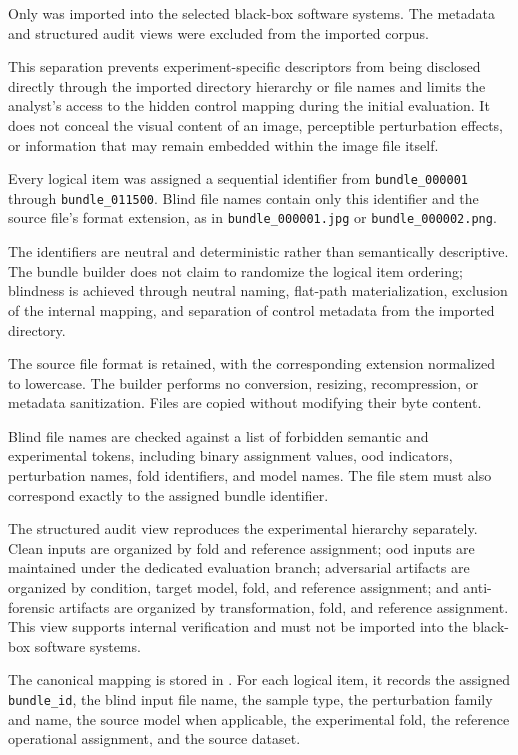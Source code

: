 Only
was imported into the selected black-box software systems. The metadata and
structured audit views were excluded from the imported corpus.

This separation prevents experiment-specific descriptors from being disclosed
directly through the imported directory hierarchy or file names and limits the
analyst's access to the hidden control mapping during the initial evaluation.
It does not conceal the visual content of an image, perceptible perturbation
effects, or information that may remain embedded within the image file itself.

Every logical item was assigned a sequential identifier from
\texttt{bundle\_000001} through \texttt{bundle\_011500}. Blind file names
contain only this identifier and the source file's format extension, as in
\texttt{bundle\_000001.jpg} or \texttt{bundle\_000002.png}.

The identifiers are neutral and deterministic rather than semantically
descriptive. The bundle builder does not claim to randomize the logical item
ordering; blindness is achieved through neutral naming, flat-path
materialization, exclusion of the internal mapping, and separation of control
metadata from the imported directory.

The source file format is retained, with the corresponding extension
normalized to lowercase. The builder performs no conversion, resizing,
recompression, or metadata sanitization. Files are copied without modifying
their byte content.

Blind file names are checked against a list of forbidden semantic and
experimental tokens, including binary assignment values, \gls{ood}
indicators, perturbation names, fold identifiers, and model names. The
file stem must also correspond exactly to the assigned bundle identifier.

The structured audit view reproduces the experimental hierarchy separately.
Clean inputs are organized by fold and reference assignment; \gls{ood} inputs
are maintained under the dedicated evaluation branch; adversarial artifacts are
organized by condition, target model, fold, and reference assignment; and
anti-forensic artifacts are organized by transformation, fold, and reference
assignment. This view supports internal verification and must not be imported
into the black-box software systems.

The canonical mapping is stored in
.
For each logical item, it records the assigned \texttt{bundle\_id}, the blind
input file name, the sample type, the perturbation family and name, the source
model when applicable, the experimental fold, the reference operational
assignment, and the source dataset.

